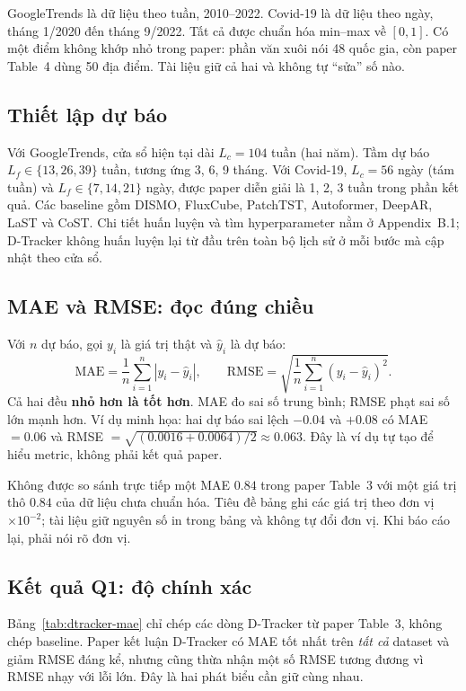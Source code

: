 GoogleTrends là dữ liệu theo tuần, 2010--2022. Covid-19 là dữ liệu theo ngày, tháng 1/2020 đến
tháng 9/2022. Tất cả được chuẩn hóa min--max về $[0,1]$. Có một điểm không khớp nhỏ trong paper:
phần văn xuôi nói 48 quốc gia, còn paper Table~4 dùng 50 địa điểm. Tài liệu giữ cả hai và không tự
``sửa'' số nào.

\subsection{Thiết lập dự báo}

Với GoogleTrends, cửa sổ hiện tại dài $L_c=104$ tuần (hai năm). Tầm dự báo
$L_f\in\{13,26,39\}$ tuần, tương ứng 3, 6, 9 tháng. Với Covid-19, $L_c=56$ ngày (tám tuần) và
$L_f\in\{7,14,21\}$ ngày, được paper diễn giải là 1, 2, 3 tuần trong phần kết quả. Các baseline
gồm DISMO, FluxCube, PatchTST, Autoformer, DeepAR, LaST và CoST. Chi tiết huấn luyện và tìm
hyperparameter nằm ở Appendix~B.1; D-Tracker không huấn luyện lại từ đầu trên toàn bộ lịch sử ở
mỗi bước mà cập nhật theo cửa sổ.

\subsection{MAE và RMSE: đọc đúng chiều}

Với $n$ dự báo, gọi $y_i$ là giá trị thật và $\hat y_i$ là dự báo:
\[
  \mathrm{MAE}=\frac1n\sum_{i=1}^n|y_i-\hat y_i|,
  \qquad
  \mathrm{RMSE}=\sqrt{\frac1n\sum_{i=1}^n(y_i-\hat y_i)^2}.
\]
Cả hai đều \textbf{nhỏ hơn là tốt hơn}. MAE đo sai số trung bình; RMSE phạt sai số lớn mạnh hơn.
Ví dụ minh họa: hai dự báo sai lệch $-0.04$ và $+0.08$ có MAE $=0.06$ và
RMSE $=\sqrt{(0.0016+0.0064)/2}\approx0.063$. Đây là ví dụ tự tạo để hiểu metric, không phải kết quả
paper.

\begin{commonmistake}
Không được so sánh trực tiếp một MAE $0.84$ trong paper Table~3 với một giá trị thô $0.84$ của dữ liệu
chưa chuẩn hóa. Tiêu đề bảng ghi các giá trị theo đơn vị $\times10^{-2}$; tài liệu giữ nguyên số in
trong bảng và không tự đổi đơn vị. Khi báo cáo lại, phải nói rõ đơn vị.
\end{commonmistake}

\subsection{Kết quả Q1: độ chính xác}

Bảng~\ref{tab:dtracker-mae} chỉ chép các dòng D-Tracker từ paper Table~3, không chép baseline.
Paper kết luận D-Tracker có MAE tốt nhất trên \emph{tất cả} dataset và giảm RMSE đáng kể, nhưng
cũng thừa nhận một số RMSE tương đương vì RMSE nhạy với lỗi lớn. Đây là hai phát biểu cần giữ cùng
nhau.

